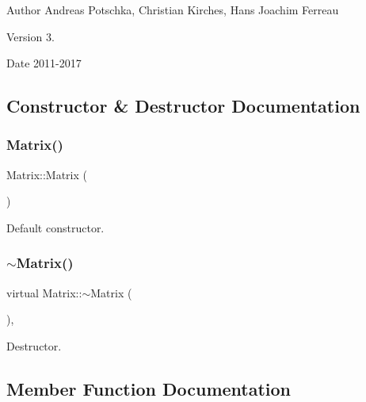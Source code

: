 \begin{DoxyAuthor}{Author}
Andreas Potschka, Christian Kirches, Hans Joachim Ferreau 
\end{DoxyAuthor}
\begin{DoxyVersion}{Version}
3. 
\end{DoxyVersion}
\begin{DoxyDate}{Date}
2011-\/2017 
\end{DoxyDate}


\subsection{Constructor \& Destructor Documentation}
\mbox{\label{class_matrix_a2dba13c45127354c9f75ef576f49269b}} 
\subsubsection{\texorpdfstring{Matrix()}{Matrix()}}
{\footnotesize\ttfamily Matrix\+::\+Matrix (\begin{DoxyParamCaption}{ }\end{DoxyParamCaption})\hspace{0.3cm}{\ttfamily [inline]}}

Default constructor. \mbox{\label{class_matrix_ac8d10e89f7b47ab95a341d70df651554}} 
\subsubsection{\texorpdfstring{$\sim$\+Matrix()}{~Matrix()}}
{\footnotesize\ttfamily virtual Matrix\+::$\sim$\+Matrix (\begin{DoxyParamCaption}{ }\end{DoxyParamCaption})\hspace{0.3cm}{\ttfamily [inline]}, {\ttfamily [virtual]}}

Destructor. 

\subsection{Member Function Documentation}
\mbox{\label{class_matrix_a7ee8d1b4ef0d5d5fb34342ea1889382f}} 
